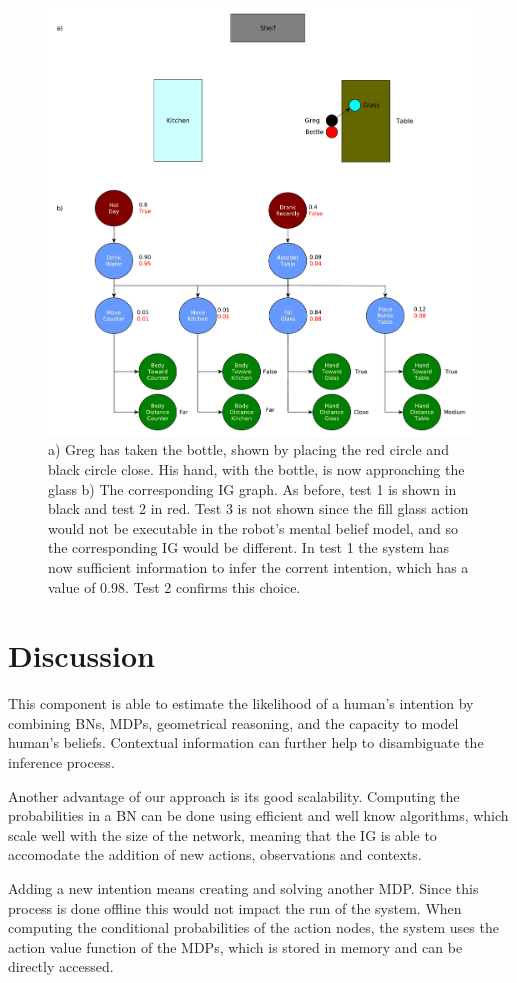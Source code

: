 \clearpage
 \begin{figure}[ht!]
	\centering
	\includegraphics[scale=0.4]{img/observer/ig_exp3.pdf}
	\caption[IG Example 3]{a) Greg has taken the bottle, shown by placing the red circle and black circle close. His hand, with the bottle, is now approaching the glass b) The corresponding IG graph. As before, test 1 is shown in black and test 2 in red. Test 3 is not shown since the fill glass action would not be executable in the robot's mental belief model, and so the corresponding IG would be different. In test 1 the system has now sufficient information to infer the corrent intention, which has a value of 0.98. Test 2 confirms this choice.}
	\label{fig:intention-ig_exp3}
\end{figure}
\clearpage

\section{Discussion}

This component is able to estimate the likelihood of a human's intention by combining BNs, MDPs, geometrical reasoning, and the capacity to model human's beliefs. Contextual information can further help to disambiguate the inference process. 

Another advantage of our approach is its good scalability. Computing the probabilities in a BN can be done using efficient and well know algorithms, which scale well with the size of the network, meaning that the IG is able to accomodate the addition of new actions, observations and contexts. 

Adding a new intention means creating and solving another MDP. Since this process is done offline this would not impact the run of the system. When computing the conditional probabilities of the action nodes, the system uses the action value function of the MDPs, which is stored in memory and can be directly accessed.
